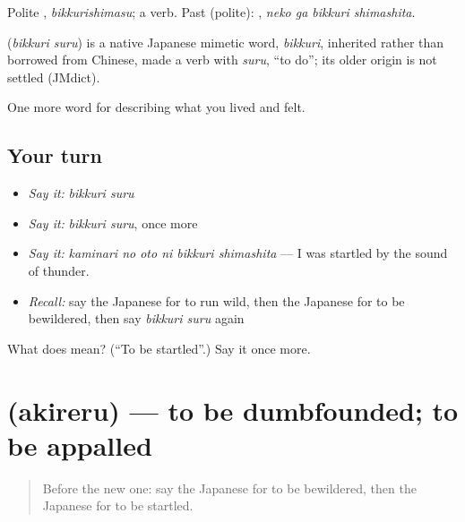 Polite \textbf{}, \emph{bikkurishimasu}; a  verb. Past (polite): \textbf{ }, \emph{neko ga bikkuri shimashita}.

\begin{cousinweb}
\textbf{} (\emph{bikkuri suru}) is a native Japanese mimetic word, \emph{bikkuri}, inherited rather than borrowed from Chinese, made a verb with \emph{suru}, \textquotedblleft{}to do\textquotedblright{}; its older origin is not settled (JMdict).
\end{cousinweb}

\begin{grammarlens}[title={What you've built}]
One more word for describing what you lived and felt.
\end{grammarlens}

\subsection*{Your turn}
\begin{itemize}
\raggedright
  \item \emph{Say it:} \emph{bikkuri suru}
  \item \emph{Say it:} \emph{bikkuri suru}, once more
  \item \emph{Say it:} \emph{kaminari no oto ni bikkuri shimashita} — I was startled by the sound of thunder.
  \item \emph{Recall:} say the Japanese for to run wild, then the Japanese for to be bewildered, then say \emph{bikkuri suru} again
\end{itemize}

\begin{tcolorbox}[breakable,colback=teal!4,colframe=teal!35!black,title={Before you move on}]
What does  mean? (\textquotedblleft{}To be startled\textquotedblright{}.) Say it once more.
\end{tcolorbox}
\section[\texorpdfstring{\ja{あきれる} (akireru)}{あきれる (akireru)}]{ (akireru) — to be dumbfounded; to be appalled}

\label{lesson:JA-C431-akireru}



\begin{quote}
Before the new one: say the Japanese for to be bewildered, then the Japanese for to be startled.
\end{quote}

